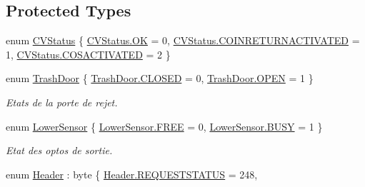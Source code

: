 \subsection*{Protected Types}
\begin{DoxyCompactItemize}
\item 
enum \mbox{\hyperlink{class_device_library_1_1_c_coin_validator_a62ce7ca9d0cc8ef92edb58f06a34add1}{C\+V\+Status}} \{ \mbox{\hyperlink{class_device_library_1_1_c_coin_validator_a62ce7ca9d0cc8ef92edb58f06a34add1ae0aa021e21dddbd6d8cecec71e9cf564}{C\+V\+Status.\+OK}} = 0, 
\mbox{\hyperlink{class_device_library_1_1_c_coin_validator_a62ce7ca9d0cc8ef92edb58f06a34add1a09784ba0e9f8a177ad98970e07381792}{C\+V\+Status.\+C\+O\+I\+N\+R\+E\+T\+U\+R\+N\+A\+C\+T\+I\+V\+A\+T\+ED}} = 1, 
\mbox{\hyperlink{class_device_library_1_1_c_coin_validator_a62ce7ca9d0cc8ef92edb58f06a34add1a00b18151c2f99ce38f6a179e84697b04}{C\+V\+Status.\+C\+O\+S\+A\+C\+T\+I\+V\+A\+T\+ED}} = 2
 \}
\item 
enum \mbox{\hyperlink{class_device_library_1_1_c_coin_validator_aec7d217f486dbce4458a64bc071fa19d}{Trash\+Door}} \{ \mbox{\hyperlink{class_device_library_1_1_c_coin_validator_aec7d217f486dbce4458a64bc071fa19da110ccf2f5d2ff4eda1fd1a494293467d}{Trash\+Door.\+C\+L\+O\+S\+ED}} = 0, 
\mbox{\hyperlink{class_device_library_1_1_c_coin_validator_aec7d217f486dbce4458a64bc071fa19daa38bd5138bf35514df41a1795ebbf5c3}{Trash\+Door.\+O\+P\+EN}} = 1
 \}
\begin{DoxyCompactList}\small\item\em Etats de la porte de rejet. \end{DoxyCompactList}\item 
enum \mbox{\hyperlink{class_device_library_1_1_c_coin_validator_ab4d515bda1d8e8679ed7dc4cc3f5c40c}{Lower\+Sensor}} \{ \mbox{\hyperlink{class_device_library_1_1_c_coin_validator_ab4d515bda1d8e8679ed7dc4cc3f5c40ca88c189a42c87aa49d667fc8ab76bc323}{Lower\+Sensor.\+F\+R\+EE}} = 0, 
\mbox{\hyperlink{class_device_library_1_1_c_coin_validator_ab4d515bda1d8e8679ed7dc4cc3f5c40ca802706a9238e2928077f97736854bad4}{Lower\+Sensor.\+B\+U\+SY}} = 1
 \}
\begin{DoxyCompactList}\small\item\em Etat des optos de sortie. \end{DoxyCompactList}\item 
enum \mbox{\hyperlink{group___header_ga5672baec375c16b1ec7bdb4b85cebaa9}{Header}} \+: byte \{ \newline
\mbox{\hyperlink{group___header_gga5672baec375c16b1ec7bdb4b85cebaa9a9ce2b30cbcbda60f1a4e9d2cd5526d20}{Header.\+R\+E\+Q\+U\+E\+S\+T\+S\+T\+A\+T\+US}} = 248, 

\end{DoxyCompactItemize}
